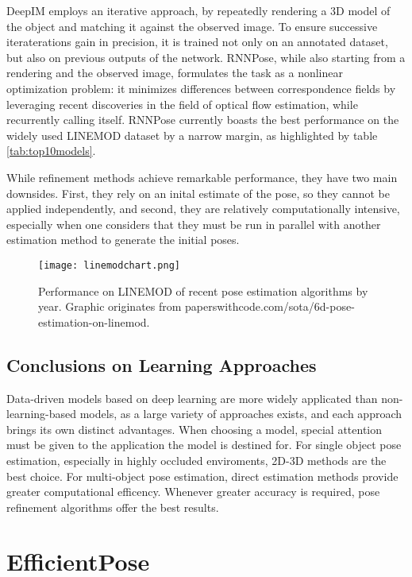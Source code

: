 DeepIM\cite{DeepIM} employs an iterative approach, by repeatedly rendering a 3D model of the object and matching it against the observed image. To ensure successive iteraterations gain in precision, it is trained not only on an annotated dataset, but also on previous outputs of the network. RNNPose\cite{RNNPose}, while also starting from a rendering and the observed image, formulates the task as a nonlinear optimization problem: it minimizes differences between correspondence fields by leveraging recent discoveries in the field of optical flow estimation, while recurrently calling itself. RNNPose currently boasts the best performance on the widely used LINEMOD\cite{linemod} dataset by a narrow margin, as highlighted by table \ref{tab:top10models}.

While refinement methods achieve remarkable performance, they have two main downsides. First, they rely on an inital estimate of the pose, so they cannot be applied independently, and second, they are relatively computationally intensive, especially when one considers that they must be run in parallel with another estimation method to generate the initial poses.

\begin{figure}[ht]
    \centering
    \texttt{[image: linemodchart.png]}
    \caption{Performance on LINEMOD of recent pose estimation algorithms by year. Graphic originates from paperswithcode.com/sota/6d-pose-estimation-on-linemod.}
    \label{fig:linemodchart}
\end{figure}

\subsection{Conclusions on Learning Approaches}

Data-driven models based on deep learning are more widely applicated than non-learning-based models, as a large variety of approaches exists, and each approach brings its own distinct advantages. When choosing a model, special attention must be given to the application the model is destined for. For single object pose estimation, especially in highly occluded enviroments, 2D-3D methods are the best choice. For multi-object pose estimation, direct estimation methods provide greater computational efficency. Whenever greater accuracy is required, pose refinement algorithms offer the best results.

\section{EfficientPose}

